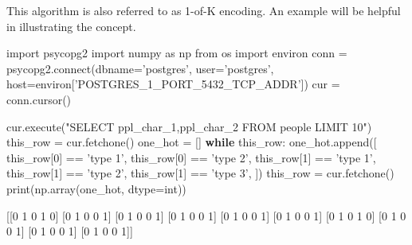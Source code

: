 \documentclass[]{report}
\newenvironment{Shaded}{}{}
\newcommand{\KeywordTok}[1]{\textcolor[rgb]{0.00,0.44,0.13}{\textbf{{#1}}}}
\newcommand{\DataTypeTok}[1]{\textcolor[rgb]{0.56,0.13,0.00}{{#1}}}
\newcommand{\DecValTok}[1]{\textcolor[rgb]{0.25,0.63,0.44}{{#1}}}
\newcommand{\CharTok}[1]{\textcolor[rgb]{0.25,0.44,0.63}{{#1}}}
\newcommand{\StringTok}[1]{\textcolor[rgb]{0.25,0.44,0.63}{{#1}}}
\newcommand{\OtherTok}[1]{\textcolor[rgb]{0.00,0.44,0.13}{{#1}}}
\newcommand{\NormalTok}[1]{{#1}}
\begin{document}
This algorithm is also referred to as 1-of-K encoding. An example will
be helpful in illustrating the concept.

\begin{Shaded}
\begin{Highlighting}[]
\CharTok{import} \NormalTok{psycopg2}
\CharTok{import} \NormalTok{numpy }\CharTok{as} \NormalTok{np}
\CharTok{from} \NormalTok{os }\CharTok{import} \NormalTok{environ}
\NormalTok{conn = psycopg2.}\OtherTok{connect}\NormalTok{(dbname=}\StringTok{'postgres'}\NormalTok{, user=}\StringTok{'postgres'}\NormalTok{, host=environ[}\StringTok{'POSTGRES_1_PORT_5432_TCP_ADDR'}\NormalTok{])}
\NormalTok{cur = conn.cursor()}

 \NormalTok{cur.execute(}\StringTok{"SELECT ppl_char_1,ppl_char_2 FROM people LIMIT 10"}\NormalTok{)}
\NormalTok{this_row = cur.fetchone()}
\NormalTok{one_hot = []}
\KeywordTok{while} \NormalTok{this_row:}
    \NormalTok{one_hot.append([}
            \NormalTok{this_row[}\DecValTok{0}\NormalTok{] == }\StringTok{'type 1'}\NormalTok{,}
            \NormalTok{this_row[}\DecValTok{0}\NormalTok{] == }\StringTok{'type 2'}\NormalTok{,}
            \NormalTok{this_row[}\DecValTok{1}\NormalTok{] == }\StringTok{'type 1'}\NormalTok{,}
            \NormalTok{this_row[}\DecValTok{1}\NormalTok{] == }\StringTok{'type 2'}\NormalTok{,}
            \NormalTok{this_row[}\DecValTok{1}\NormalTok{] == }\StringTok{'type 3'}\NormalTok{,}
        \NormalTok{])}
    \NormalTok{this_row = cur.fetchone()}
\DataTypeTok{print}\NormalTok{(np.array(one_hot, dtype=}\DataTypeTok{int}\NormalTok{))}

\NormalTok{[[}\DecValTok{0} \DecValTok{1} \DecValTok{0} \DecValTok{1} \DecValTok{0}\NormalTok{]}
 \NormalTok{[}\DecValTok{0} \DecValTok{1} \DecValTok{0} \DecValTok{0} \DecValTok{1}\NormalTok{]}
 \NormalTok{[}\DecValTok{0} \DecValTok{1} \DecValTok{0} \DecValTok{0} \DecValTok{1}\NormalTok{]}
 \NormalTok{[}\DecValTok{0} \DecValTok{1} \DecValTok{0} \DecValTok{0} \DecValTok{1}\NormalTok{]}
 \NormalTok{[}\DecValTok{0} \DecValTok{1} \DecValTok{0} \DecValTok{0} \DecValTok{1}\NormalTok{]}
 \NormalTok{[}\DecValTok{0} \DecValTok{1} \DecValTok{0} \DecValTok{0} \DecValTok{1}\NormalTok{]}
 \NormalTok{[}\DecValTok{0} \DecValTok{1} \DecValTok{0} \DecValTok{1} \DecValTok{0}\NormalTok{]}
 \NormalTok{[}\DecValTok{0} \DecValTok{1} \DecValTok{0} \DecValTok{0} \DecValTok{1}\NormalTok{]}
 \NormalTok{[}\DecValTok{0} \DecValTok{1} \DecValTok{0} \DecValTok{0} \DecValTok{1}\NormalTok{]}
 \NormalTok{[}\DecValTok{0} \DecValTok{1} \DecValTok{0} \DecValTok{0} \DecValTok{1}\NormalTok{]]}
 
\end{Highlighting}
\end{Shaded}
\end{document}
